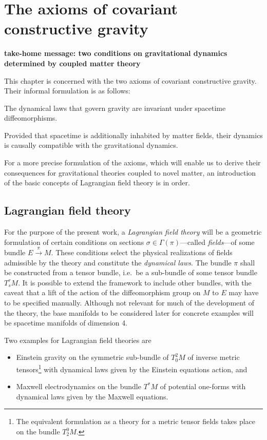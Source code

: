 \chapter{The axioms of covariant constructive gravity}\label{chapter_axioms}

\textbf{take-home message: two conditions on gravitational dynamics determined by coupled matter theory}

This chapter is concerned with the two axioms of covariant constructive gravity. Their informal formulation is as follows:
\begin{axiom}
  The dynamical laws that govern gravity are invariant under spacetime diffeomorphisms. \cite{Alex_2020}
\end{axiom}
\begin{axiom}
  Provided that spacetime is additionally inhabited by matter fields, their dynamics is causally compatible with the gravitational dynamics. \cite{Alex_2020}
\end{axiom}

For a more precise formulation of the axioms, which will enable us to derive their consequences for gravitational theories coupled to novel matter, an introduction of the basic concepts of Lagrangian field theory is in order.

\section{Lagrangian field theory}
For the purpose of the present work, a \emph{Lagrangian field theory} will be a geometric formulation of certain conditions on sections $\sigma\in\Gamma(\pi)$---called \emph{fields}---of some bundle $E\overset{\pi}{\longrightarrow} M$. These conditions select the physical realizations of fields admissible by the theory and constitute the \emph{dynamical laws}. The bundle $\pi$ shall be constructed from a tensor bundle, i.e.~be a sub-bundle of some tensor bundle $T^r_sM$. It is possible to extend the framework to include other bundles, with the caveat that a lift of the action of the diffeomorphism group on $M$ to $E$ may have to be specified manually. Although not relevant for much of the development of the theory, the base manifolds to be considered later for concrete examples will be spacetime manifolds of dimension 4.

\begin{example}
  Two examples for Lagrangian field theories are
  \begin{itemize}
    \item Einstein gravity on the symmetric sub-bundle of $T^2_0M$ of inverse metric tensors\footnote{The equivalent formulation as a theory for a metric tensor fields takes place on the bundle $T^0_2M$.} with dynamical laws given by the Einstein equations action, and
    \item Maxwell electrodynamics on the bundle $T^\ast M$ of potential one-forms with dynamical laws given by the Maxwell equations.
  \end{itemize}
\end{example}

